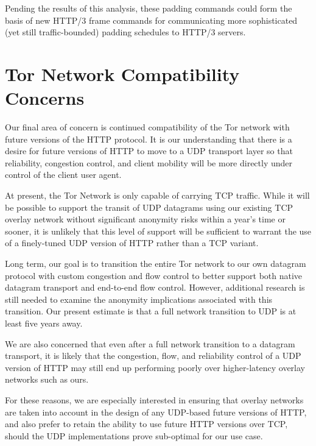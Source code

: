 \documentclass[letterpaper,11pt]{llncs}
\begin{document}
Pending the results of this analysis, these padding commands could form the
basis of new HTTP/3 frame commands for communicating more sophisticated (yet
still traffic-bounded) padding schedules to HTTP/3 servers.


\section{Tor Network Compatibility Concerns}

Our final area of concern is continued compatibility of the Tor network with
future versions of the HTTP protocol. It is our understanding that there is a
desire for future versions of HTTP to move to a UDP transport layer so that
reliability, congestion control, and client mobility will be more directly
under control of the client user agent.

At present, the Tor Network is only capable of carrying TCP traffic. While it
will be possible to support the transit of UDP datagrams using our existing
TCP overlay network without significant anonymity risks within a year's time
or sooner, it is unlikely that this level of support will be sufficient to
warrant the use of a finely-tuned UDP version of HTTP rather than a TCP
variant.

Long term, our goal is to transition the entire Tor network to our own
datagram protocol with custom congestion and flow control to better support
both native datagram transport and end-to-end flow control. However,
additional research is still needed to examine the anonymity implications
associated with this transition\cite{tor-udp}. Our present estimate is that a
full network transition to UDP is at least five years away.

We are also concerned that even after a full network transition to a datagram
transport, it is likely that the congestion, flow, and reliability control of
a UDP version of HTTP may still end up performing poorly over higher-latency
overlay networks such as ours.

For these reasons, we are especially interested in ensuring that overlay
networks are taken into account in the design of any UDP-based future versions
of HTTP, and also prefer to retain the ability to use future HTTP versions
over TCP, should the UDP implementations prove sub-optimal for our use case.



 

\clearpage
\appendix
\end{document}
